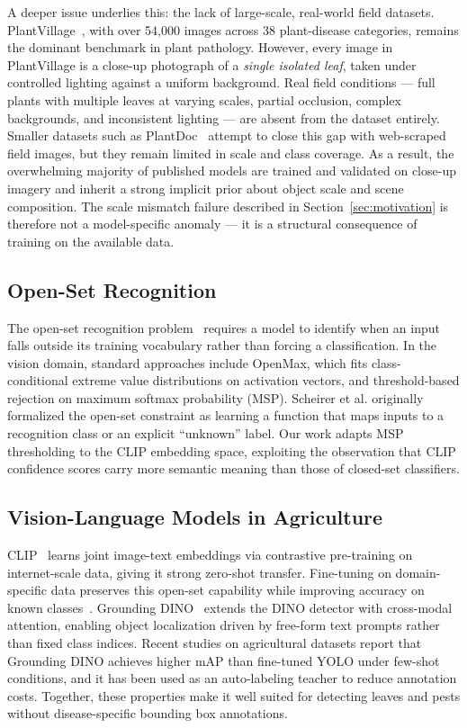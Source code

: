 \documentclass[runningheads]{llncs}
\begin{document}
A deeper issue underlies this: the lack of large-scale, real-world field datasets. PlantVillage~\cite{hughes2015open}, with over 54,000 images across 38 plant-disease categories, remains the dominant benchmark in plant pathology. However, every image in PlantVillage is a close-up photograph of a \emph{single isolated leaf}, taken under controlled lighting against a uniform background. Real field conditions --- full plants with multiple leaves at varying scales, partial occlusion, complex backgrounds, and inconsistent lighting --- are absent from the dataset entirely. Smaller datasets such as PlantDoc~\cite{singha2020plantdoc} attempt to close this gap with web-scraped field images, but they remain limited in scale and class coverage. As a result, the overwhelming majority of published models are trained and validated on close-up imagery and inherit a strong implicit prior about object scale and scene composition. The scale mismatch failure described in Section~\ref{sec:motivation} is therefore not a model-specific anomaly --- it is a structural consequence of training on the available data.

\subsection{Open-Set Recognition}
The open-set recognition problem~\cite{dhamija2020overlooked} requires a model to identify when an input falls outside its training vocabulary rather than forcing a classification. In the vision domain, standard approaches include OpenMax, which fits class-conditional extreme value distributions on activation vectors, and threshold-based rejection on maximum softmax probability (MSP). Scheirer et al. originally formalized the open-set constraint as learning a function that maps inputs to a recognition class or an explicit ``unknown'' label. Our work adapts MSP thresholding to the CLIP embedding space, exploiting the observation that CLIP confidence scores carry more semantic meaning than those of closed-set classifiers.

\subsection{Vision-Language Models in Agriculture}
CLIP~\cite{radford2021learning} learns joint image-text embeddings via contrastive pre-training on internet-scale data, giving it strong zero-shot transfer. Fine-tuning on domain-specific data preserves this open-set capability while improving accuracy on known classes~\cite{clip_plant_2024}. Grounding DINO~\cite{liu2023grounding} extends the DINO detector with cross-modal attention, enabling object localization driven by free-form text prompts rather than fixed class indices. Recent studies on agricultural datasets report that Grounding DINO achieves higher mAP than fine-tuned YOLO under few-shot conditions, and it has been used as an auto-labeling teacher to reduce annotation costs. Together, these properties make it well suited for detecting leaves and pests without disease-specific bounding box annotations.
\end{document}
